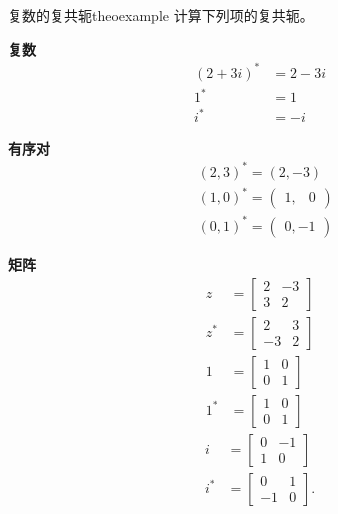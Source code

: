 \begin{myexample}{复数的复共轭}{theoexample}
计算下列项的复共轭。

\textbf{复数}
$$
  \begin{aligned}
    (2+3 i)^{*} & =2-3 i \\
    1^{*}       & =1     \\
    i^{*}       & =-i
  \end{aligned}
$$

\textbf{有序对}
$$
  \begin{aligned}
     & (2,3)^{*}=(2,-3)                                   \\
     & (1,0)^{*}=\left(\begin{array}{ll}
        1, & 0
      \end{array}\right) \\
     & (0,1)^{*}=\left(\begin{array}{ll}
        0,-1
      \end{array}\right)
  \end{aligned}
$$

\textbf{矩阵}
$$
  \begin{aligned}
    z     & =\left[\begin{array}{cc}
        2 & -3 \\
        3 & 2
      \end{array}\right] \\
    z^{*} & =\left[\begin{array}{cc}
        2  & 3 \\
        -3 & 2
      \end{array}\right] \\
    1     & =\left[\begin{array}{ll}
        1 & 0 \\
        0 & 1
      \end{array}\right] \\
    1^{*} & =\left[\begin{array}{ll}
        1 & 0 \\
        0 & 1
      \end{array}\right]
  \end{aligned}
$$
$$
  \begin{aligned}
    i     & =\left[\begin{array}{cc}
        0 & -1 \\
        1 & 0
      \end{array}\right]   \\
    i^{*} & =\left[\begin{array}{cc}
        0  & 1 \\
        -1 & 0
      \end{array}\right] .
  \end{aligned}
$$
\end{myexample}

